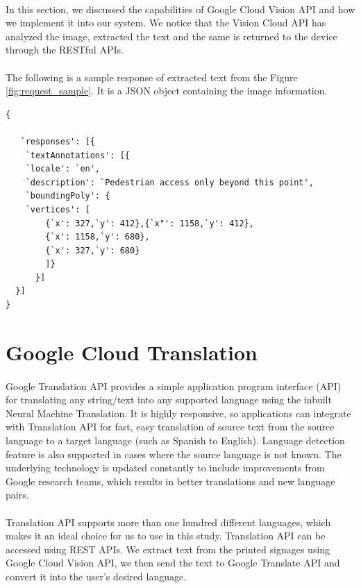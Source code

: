 \documentclass[12pt]{article}
\begin{document}
\paragraph{} In this section, we discussed the capabilities of Google Cloud Vision API and how we implement it into our system. We notice that the Vision Cloud API has analyzed the image, extracted the text and the same is returned to the device through the RESTful APIs.  

\paragraph{}The following is a sample response of extracted text from the Figure \ref{fig:request_sample}. It is a JSON object containing the image information.


\begin{lstlisting}
{
   
   `responses': [{
	`textAnnotations': [{
	`locale': `en',
	`description': `Pedestrian access only beyond this point',
	`boundingPoly': {
	`vertices': [
		{`x': 327,`y': 412},{`x"': 1158,`y': 412},
		{`x': 1158,`y': 680},
		{`x': 327,`y': 680}
		]}
	  }]
  }]
}
\end{lstlisting}


\section{Google Cloud Translation}
\label{translate}

\paragraph{}Google Translation API provides a simple application program interface (API) for translating any string/text into any supported language using the inbuilt Neural Machine Translation. It is highly responsive, so applications can integrate with Translation API for fast, easy translation of source text from the source language to a target language (such as Spanish to English). Language detection feature is also supported in cases where the source language is not known. The underlying technology is updated constantly to include improvements from Google research teams, which results in better translations and new language pairs.

\paragraph{}Translation API supports more than one hundred different languages, which makes it an ideal choice for us to use in this study. Translation API can be accessed using REST APIs. We extract text from the printed signages using Google Cloud Vision API, we then send the text to Google Translate API and convert it into the user's desired language.
\end{document}
